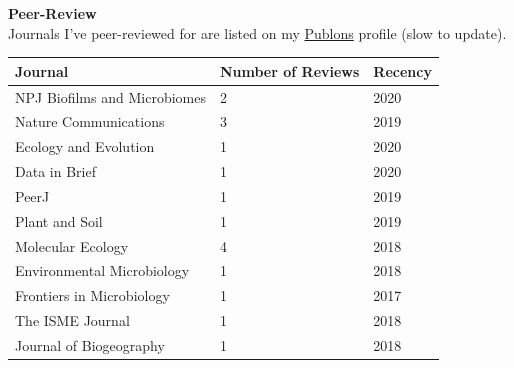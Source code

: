 \documentclass{article}
\begin{document}
{\large  \textbf{Peer-Review}}\\
Journals I've peer-reviewed for are listed on my \href{https://publons.com/researcher/1262170/john-l-darcy/peer-review/}{Publons} profile (slow to update). 
\\\begin{tabular}{l l l}
  Journal & Number of Reviews & Recency\\
  \hline
  NPJ Biofilms and Microbiomes & 2 & 2020\\
  Nature Communications & 3 & 2019\\
  Ecology and Evolution & 1 & 2020\\
  Data in Brief & 1 & 2020\\
  PeerJ & 1 & 2019\\
  Plant and Soil & 1 & 2019\\
  Molecular Ecology & 4 & 2018\\
  Environmental Microbiology & 1 & 2018\\
  Frontiers in Microbiology & 1 & 2017\\
  The ISME Journal & 1 & 2018\\
  Journal of Biogeography & 1 & 2018\\
\end{tabular}
\vspace{3mm}
\end{document}
